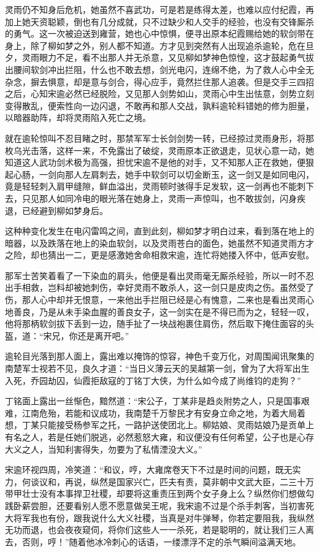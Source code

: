 灵雨仍不知身后危机，她虽然不喜武功，可是若是练得太差，也难以应付纪霞，再加上她天资聪颖，倒也有几分成就，只不过缺少和人交手的经验，也没有交锋厮杀的勇气。这一次被迫送到雍营，她也心中惊惧，便寻出原本纪霞赐给她的软剑带在身上，除了柳如梦之外，别人都不知道。方才见到突然有人出现追杀逾轮，危在旦夕，灵雨眼力不足，看不出那人并无杀意，又见柳如梦神色惊惶，这才鼓起勇气拔出腰间软剑冲出拦阻，什么也不敢去想，剑光电闪，连绵不绝，为了救人心中全无杂念，摒去惧意，却是意与剑合，得心应手，竟然拦住那人追袭。但是交手三四招之后，心知宋逾必然已经脱险，又见那人剑势如山，灵雨心中生出怯意，剑势立刻变得散乱，便索性向一边闪退，不敢再和那人交战，孰料逾轮料错她的修为胆量，以暗器助阵，却将灵雨陷入死亡之境。

就在逾轮惊叫不忍目睹之时，那禁军军士长剑剑势一转，已经掠过灵雨身形，将那枚乌光击落，这样一来，不免露出了破绽，灵雨原本正欲退走，见状心意一动，她知道这人武功剑术极为高强，担忧宋逾不是他的对手，又不知那人正在救她，便狠起心肠，一剑向那人左肩刺去，她手中软剑可以切金断玉，这一剑又是如同电闪，竟是轻轻刺入肩甲缝隙，鲜血溢出，灵雨顿时骇得手足发软，这一剑再也不能刺下去，只见那人如同冷电的眼光落在她身上，灵雨一声惊叫，也不敢拔剑，闪身疾退，已经避到柳如梦身后。

这种种变化发生在电闪雷鸣之间，直到此刻，柳如梦才明白过来，看到落在地上的暗器，以及跌落在地上的染血软剑，以及灵雨苍白的面色，她虽然不知道灵雨方才之险，却也猜出一二，更是感激她舍命相救宋逾，连忙将她搂入怀中，低声安慰。

那军士苦笑着看了一下染血的肩头，他便是看出灵雨毫无厮杀经验，所以一时不忍出手相救，岂料却被她刺伤，幸好灵雨不敢杀人，这一剑只是皮肉之伤。虽然受了伤，那人心中却并无恨意，一来他出手拦阻已经是心有愧意，二来也是看出灵雨心地善良，乃是从未手染血腥的善良女子，这一剑实在是不得已而为之，轻轻一叹，他将那柄软剑拔下丢到一边，随手扯了一块战袍裹住肩伤，然后取下掩住面容的头盔，道：“宋兄，你还是离开吧。”

逾轮目光落到那人面上，露出难以掩饰的惊容，神色千变万化，对周围闻讯聚集的南楚军士视若不见，良久才道：“当日义薄云天的吴越第一剑，曾为了大将军出生入死，乔园劫囚，仙霞拒敌寇的丁铭丁大侠，为什么如今成了尚维钧的走狗？”

丁铭面上露出一丝惭色，黯然道：“宋公子，丁某非是趋炎附势之人，只是国事艰难，江南危殆，若能和议成功，我南楚千万黎民才有安身立命之地，为着大局着想，丁某只能接受杨参军之托，一路护送使团北上。柳姑娘、灵雨姑娘乃是贡单上有名之人，若是任她们脱逃，必然惹怒大雍，和议便没有任何希望，公子也是心存大义之人，当知利害得失，勿要为了私情湮没大义。”

宋逾环视四周，冷笑道：“和议，哼，大雍席卷天下不过是时间的问题，既无实力，何谈议和，再说，纵然是国家兴亡，匹夫有责，莫非朝中文武大臣，二三十万带甲壮士没有本事捍卫社稷，却要将这重责压到两个女子身上么？纵然你们想做勾践卧薪尝胆，还要看别人愿不愿意做吴王呢，我宋逾不过是个杀手刺客，当初害死大将军我也有份，跟我说什么大义社稷，当真是对牛弹琴，你若定要阻我，我纵然无功而退，也会夜夜窥伺，将你们这些人一一杀死，若是聪明的，就让我们三人离去，否则，哼！”随着他冰冷刺心的话语，一缕漂浮不定的杀气瞬间溢满天地。

